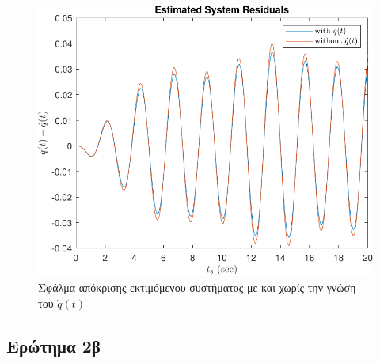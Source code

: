 \documentclass[a4paper,12pt]{article}
\begin{document}
\begin{figure}
    \centering
    \includegraphics[width=0.5\linewidth]{plot/task2_residuals.pdf}
    \caption{Σφάλμα απόκρισης εκτιμόμενου συστήματος με και χωρίς την γνώση του $\dot{q}(t)$}
    \label{fig:task2_residuals}
\end{figure}

\subsection*{Ερώτημα 2β}

\end{document}
